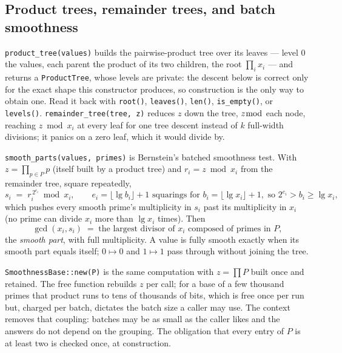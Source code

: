 \documentclass[11pt]{article}
\newcommand{\code}[1]{\texttt{#1}}
\begin{document}
\subsection{Product trees, remainder trees, and batch smoothness}

\code{product\_tree(values)} builds the pairwise-product tree over its
leaves --- level 0 the values, each parent the product of its two children,
the root $\prod_i x_i$ --- and returns a \code{ProductTree}, whose levels
are private: the descent below is correct only for the exact shape this
constructor produces, so construction is the only way to obtain one. Read
it back with \code{root()}, \code{leaves()}, \code{len()},
\code{is\_empty()}, or \code{levels()}. \code{remainder\_tree(tree, z)} reduces $z$ down
the tree, $z \bmod$ each node, reaching $z \bmod x_i$ at every leaf for one
tree descent instead of $k$ full-width divisions; it panics on a zero leaf,
which it would divide by.

\code{smooth\_parts(values, primes)} is Bernstein's batched smoothness
test. With $z = \prod_{p \in P} p$ (itself built by a product tree) and
$r_i = z \bmod x_i$ from the remainder tree, square repeatedly,
\begin{equation}
s_i \;=\; r_i^{\,2^{e_i}} \bmod x_i,
\qquad e_i = \lfloor \lg b_i \rfloor + 1
\text{ squarings for } b_i = \lfloor \lg x_i \rfloor + 1,
\text{ so } 2^{e_i} > b_i \ge \lg x_i,
\end{equation}
which pushes every smooth prime's multiplicity in $s_i$ past its
multiplicity in $x_i$ (no prime can divide $x_i$ more than $\lg x_i$
times). Then
\begin{equation}
\gcd(x_i, s_i) \;=\; \text{the largest divisor of } x_i
\text{ composed of primes in } P,
\end{equation}
the \emph{smooth part}, with full multiplicity. A value is fully smooth
exactly when its smooth part equals itself; $0 \mapsto 0$ and
$1 \mapsto 1$ pass through without joining the tree.

\code{SmoothnessBase::new(P)} is the same computation with $z = \prod P$ built
once and retained. The free function rebuilds $z$ per call; for a base of a
few thousand primes that product runs to tens of thousands of bits, which is
free once per run but, charged per batch, dictates the batch size a caller
may use. The context removes that coupling: batches may be as small as the
caller likes and the answers do not depend on the grouping. The obligation
that every entry of $P$ is at least two is checked once, at construction.
\end{document}
